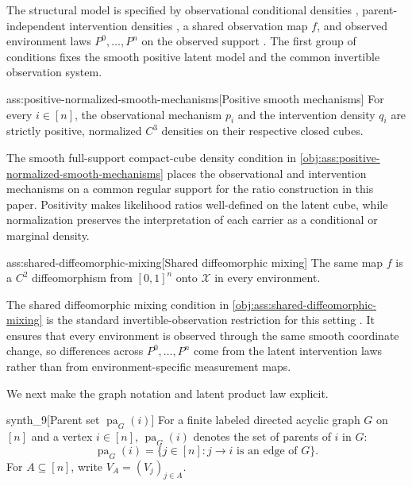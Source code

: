 \documentclass[11pt]{article}
\begin{document}
The structural model is specified by observational conditional densities , parent-independent intervention densities , a shared observation map \(f\), and observed environment laws \(P^0,\ldots,P^n\) on the observed support . The first group of conditions fixes the smooth positive latent model and the common invertible observation system.

\begin{assumptionv}{ass:positive-normalized-smooth-mechanisms}[Positive smooth mechanisms]
For every \(i\in[n]\), the observational mechanism \(p_i\) and the intervention density \(q_i\) are strictly positive, normalized \(C^3\) densities on their respective closed cubes.
\end{assumptionv}

The smooth full-support compact-cube density condition in \cref{obj:ass:positive-normalized-smooth-mechanisms} places the observational and intervention mechanisms on a common regular support for the ratio construction in this paper. Positivity makes likelihood ratios well-defined on the latent cube, while normalization preserves the interpretation of each carrier as a conditional or marginal density.

\begin{assumptionv}{ass:shared-diffeomorphic-mixing}[Shared diffeomorphic mixing]
The same map \(f\) is a \(C^2\) diffeomorphism from \([0,1]^n\) onto \(\mathcal X\) in every environment.
\end{assumptionv}

The shared diffeomorphic mixing condition in \cref{obj:ass:shared-diffeomorphic-mixing} is the standard invertible-observation restriction for this setting \citep{vonKugelgenEtAl2023UnknownInterventions}. It ensures that every environment is observed through the same smooth coordinate change, so differences across \(P^0,\ldots,P^n\) come from the latent intervention laws rather than from environment-specific measurement maps.

We next make the graph notation and latent product law explicit.

\begin{definitionv}{synth_9}[Parent set \(\operatorname{pa}_G(i)\)]
For a finite labeled directed acyclic graph \(G\) on \([n]\) and a vertex \(i\in[n]\), \(\operatorname{pa}_G(i)\) denotes the set of parents of \(i\) in \(G\):
\[
\operatorname{pa}_G(i)=\{j\in[n]: j\to i \text{ is an edge of }G\}.
\]
For \(A\subseteq[n]\), write \(V_A=(V_j)_{j\in A}\).
\end{definitionv}
\end{document}
